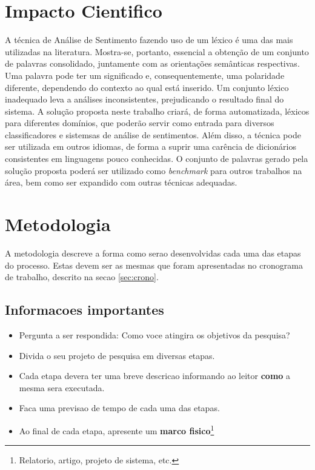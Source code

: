 \documentclass[a4paper,11pt]{article}
\begin{document}
\section{Impacto Cientifico}
A técnica de Análise de Sentimento fazendo uso de um léxico é uma das mais utilizadas na literatura. Mostra-se, portanto, essencial a obtenção de um conjunto de palavras consolidado, juntamente com as orientações semânticas respectivas. 
Uma palavra pode ter um significado e, consequentemente, uma polaridade diferente, dependendo do contexto ao qual está inserido. 
Um conjunto léxico inadequado leva a análises inconsistentes, prejudicando o resultado final do sistema.
A solução proposta neste trabalho criará, de forma automatizada, léxicos para diferentes domínios, que poderão servir como entrada para diversos classificadores e sistemsas de análise de sentimentos. Além disso, a técnica pode ser utilizada em outros idiomas, de forma a suprir uma carência de dicionários consistentes em linguagens pouco conhecidas.
O conjunto de palavras gerado pela solução proposta poderá ser utilizado como \emph{benchmark} para outros trabalhos na área, bem como ser expandido com outras técnicas adequadas.

\section{Metodologia}

A metodologia descreve a forma como serao desenvolvidas cada uma das etapas do processo. Estas devem ser as mesmas que foram apresentadas no cronograma de trabalho, descrito na secao \ref{sec:crono}.

\subsection{Informacoes importantes}
\begin{itemize}
\item{Pergunta a ser respondida: Como voce atingira os objetivos da pesquisa?}
\item{Divida o seu projeto de pesquisa em diversas etapas.}
\item{Cada etapa devera ter uma breve descricao informando ao leitor \textbf{como} a mesma sera executada.}
\item{Faca uma previsao de tempo de cada uma das etapas.}
\item{Ao final de cada etapa, apresente um \textbf{marco fisico}\footnote{Relatorio, artigo, projeto de sistema, etc.}}
\end{itemize}
\end{document}
